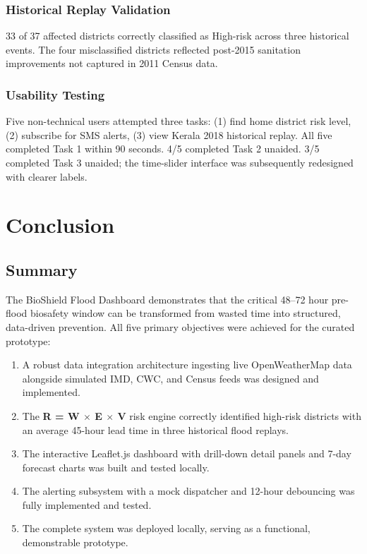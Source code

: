 \documentclass[12pt,a4paper]{report}
\begin{document}
\subsection{Historical Replay Validation}
33 of 37 affected districts correctly classified as High-risk across three historical events. The four misclassified districts reflected post-2015 sanitation improvements not captured in 2011 Census data.

\subsection{Usability Testing}
Five non-technical users attempted three tasks: (1) find home district risk level, (2) subscribe for SMS alerts, (3) view Kerala 2018 historical replay. All five completed Task 1 within 90 seconds. 4/5 completed Task 2 unaided. 3/5 completed Task 3 unaided; the time-slider interface was subsequently redesigned with clearer labels.

\chapter{Conclusion}

\section{Summary}

The BioShield Flood Dashboard demonstrates that the critical 48--72 hour pre-flood biosafety window can be transformed from wasted time into structured, data-driven prevention. All five primary objectives were achieved for the curated prototype:

\begin{enumerate}[noitemsep]
  \item A robust data integration architecture ingesting live OpenWeatherMap data alongside simulated IMD, CWC, and Census feeds was designed and implemented.
  \item The \textbf{R = W $\times$ E $\times$ V} risk engine correctly identified high-risk districts with an average 45-hour lead time in three historical flood replays.
  \item The interactive Leaflet.js dashboard with drill-down detail panels and 7-day forecast charts was built and tested locally.
  \item The alerting subsystem with a mock dispatcher and 12-hour debouncing was fully implemented and tested.
  \item The complete system was deployed locally, serving as a functional, demonstrable prototype.
\end{enumerate}
\end{document}
